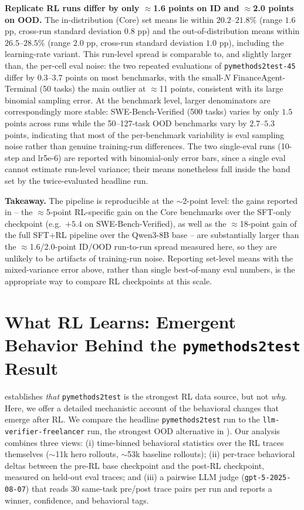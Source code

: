\documentclass{article}
\begin{document}


\textbf{Replicate RL runs differ by only $\approx$1.6 points on ID and $\approx$2.0 points on OOD.} The in-distribution (Core) set means lie within $20.2$--$21.8\%$ (range $1.6$ pp, cross-run standard deviation $0.8$ pp) and the out-of-distribution means within $26.5$--$28.5\%$ (range $2.0$ pp, cross-run standard deviation $1.0$ pp), including the learning-rate variant. This run-level spread is comparable to, and slightly larger than, the per-cell eval noise: the two repeated evaluations of \texttt{pymethods2test-45} differ by $0.3$--$3.7$ points on most benchmarks, with the small-$N$ FinanceAgent-Terminal (50 tasks) the main outlier at $\approx$11 points, consistent with its large binomial sampling error. At the benchmark level, larger denominators are correspondingly more stable: SWE-Bench-Verified (500 tasks) varies by only $1.5$ points across runs while the 50--127-task OOD benchmarks vary by $2.7$--$5.3$ points, indicating that most of the per-benchmark variability is eval sampling noise rather than genuine training-run differences. The two single-eval runs (10-step and lr5e-6) are reported with binomial-only error bars, since a single eval cannot estimate run-level variance; their means nonetheless fall inside the band set by the twice-evaluated headline run.

\textbf{Takeaway.} The pipeline is reproducible at the $\sim$2-point level: the gains reported in  -- the $\approx$5-point RL-specific gain on the Core benchmarks over the SFT-only checkpoint (e.g.\ $+5.4$ on SWE-Bench-Verified), as well as the $\approx$18-point gain of the full SFT+RL pipeline over the Qwen3-8B base -- are substantially larger than the $\approx$1.6/2.0-point ID/OOD run-to-run spread measured here, so they are unlikely to be artifacts of training-run noise. Reporting set-level means with the mixed-variance error above, rather than single best-of-many eval numbers, is the appropriate way to compare RL checkpoints at this scale.

\section{What RL Learns: Emergent Behavior Behind the \texttt{pymethods2test} Result}
\label{app:rl-behavior}

 establishes \emph{that} \texttt{pymethods2test} is the strongest RL data source, but not \emph{why}. Here, we offer a detailed mechanistic account of the behavioral changes that emerge after RL. We compare the headline \texttt{pymethods2test} run to the \texttt{llm-verifier-freelancer}  run, the strongest OOD alternative in ). Our analysis combines three views: (i) time-binned behavioral statistics over the RL traces themselves ($\sim$11k hero rollouts, $\sim$53k baseline rollouts); (ii) per-trace behavioral deltas between the pre-RL base checkpoint and the post-RL checkpoint, measured on held-out eval traces; and (iii) a pairwise LLM judge (\texttt{gpt-5-2025-08-07}) that reads $30$ same-task pre/post trace pairs per run and reports a winner, confidence, and behavioral tags.
\end{document}

